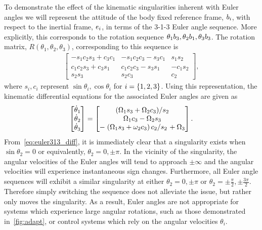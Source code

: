 To demonstrate the effect of the kinematic singularities inherent with Euler angles we will represent the attitude of the body fixed reference frame, \( b_i \), with respect to the inertial frame, \( e_i\), in terms of the 3-1-3 Euler angle sequence.
More explicitly, this corresponds to the rotation sequence \( \theta_1 b_3 , \theta_2 b_1, \theta_3 b_3 \).
The rotation matrix, \( R(\theta_1, \theta_2, \theta_3) \), corresponding to this sequence is 
\begin{align}\label{eq:euler313}
    \begin{bmatrix}
        -s_1 c_2 s_3 + c_3 c_1 & -s_1 c_2 c_3 - s_3 c_1 & s_1s_2 \\
        c_1 c_2 s_3 + c_3 s_1 & c_1 c_2 c_3 - s_3 s_1 & - c_1 s_2 \\
        s_2 s_3 & s_2 c_3 & c_2
    \end{bmatrix} ,
\end{align}
where \( s_i, c_i \) represent \( \sin \theta_i, \cos \theta_i \) for \( i = \left\{ 1,2,3 \right\}\).
Using this representation, the kinematic differential equations for the associated Euler angles are given as
\begin{align}\label{eq:euler313_diff}
    \begin{bmatrix}
        \dot{\theta}_1 \\ \dot{\theta}_2 \\ \dot{\theta}_3 
    \end{bmatrix}
    =
    \begin{bmatrix}
        \left.\left( \Omega_1 s_3 + \Omega_2 c_3 \right)\middle/s_2\right. \\
        \Omega_1 c_3 - \Omega_2 s_3 \\
        -\left.\left( \Omega_1 s_3 + \omega_2 c_3 \right)c_2\middle/s_2\right. + \Omega_3
    \end{bmatrix} .
\end{align}
From~\cref{eq:euler313_diff}, it is immediately clear that a singularity exists when \( \sin \theta_2 = 0 \) or equivalently, \( \theta_2 = 0, \pm \pi \). 
In the vicinity of the singularity, the angular velocities of the Euler angles will tend to approach \( \pm \infty \) and the angular velocities will experience instantaneous sign changes.
Furthermore, all Euler angle sequences will exhibit a similar singularity at either \( \theta_2 = 0, \pm \pi \) or \( \theta_2 = \pm \frac{\pi}{2}, \pm \frac{3\pi}{2} \).
Therefore simply switching the sequence does not alleviate the issue, but rather only moves the singularity.
As a result, Euler angles are not appropriate for systems which experience large angular rotations, such as those demonstrated in~\cref{fig:adapt}, or control systems which rely on the angular velocities \( \theta_i \).



